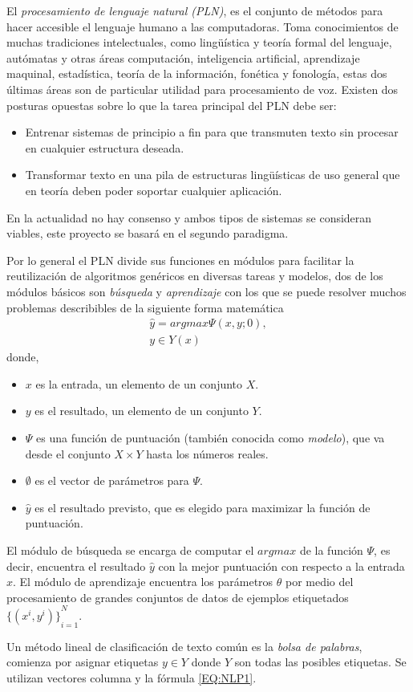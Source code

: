 El \emph{procesamiento de lenguaje natural (PLN)}, es el conjunto de métodos para hacer accesible el lenguaje humano a las computadoras\cite{eise19}. Toma conocimientos de muchas tradiciones intelectuales, como lingüística y teoría formal del lenguaje, autómatas y otras áreas computación, inteligencia artificial, aprendizaje maquinal, estadística, teoría de la información, fonética y fonología, estas dos últimas áreas son de particular utilidad para procesamiento de voz. Existen dos posturas opuestas sobre lo que la tarea principal del PLN debe ser:
\begin{itemize}
	\item Entrenar sistemas de principio a fin para que transmuten texto sin procesar en cualquier estructura deseada.
	\item Transformar texto en una pila de estructuras lingüísticas de uso general que en teoría deben poder soportar cualquier aplicación.
\end{itemize}
En la actualidad no hay consenso y ambos tipos de sistemas se consideran viables, este proyecto se basará en el segundo paradigma. 

Por lo general el PLN divide sus funciones en módulos para facilitar la reutilización de algoritmos genéricos en diversas tareas y modelos, dos de los módulos básicos son \emph{búsqueda} y \emph{aprendizaje} con los que se puede resolver muchos problemas describibles de la siguiente forma matemática
\begin{equation}
\begin{matrix}
\hat{y}=argmax\Psi(x,y;0),\\
y\in Y(x)
\end{matrix}\label{EQ:NLP1}
\end{equation}
donde,
\begin{itemize}
	\item $x$ es la entrada, un elemento de un conjunto $X$.
	\item $y$ es el resultado, un elemento de un conjunto $Y$.
	\item $\Psi$ es una función de puntuación (también conocida como \emph{modelo}), que va desde el conjunto $X\times Y$ hasta los números reales.
	\item $\emptyset$ es el vector de parámetros para $\Psi$.
	\item $\hat{y}$ es el resultado previsto, que es elegido para maximizar la función de puntuación.
\end{itemize}
El módulo de búsqueda se encarga de computar el $argmax$ de la función $\Psi$, es decir, encuentra el resultado $\hat{y}$ con la mejor puntuación con respecto a la entrada $x$. El módulo de aprendizaje encuentra los parámetros $\theta$ por medio del procesamiento de grandes conjuntos de datos de ejemplos etiquetados ${\{(x^i,y^i)\}}_{i=1}^{N}$.

Un método lineal de clasificación de texto común es la \emph{bolsa de palabras}, comienza por asignar etiquetas $y\in Y$ donde $Y$ son todas las posibles etiquetas. Se utilizan vectores columna y la fórmula \ref{EQ:NLP1}. 